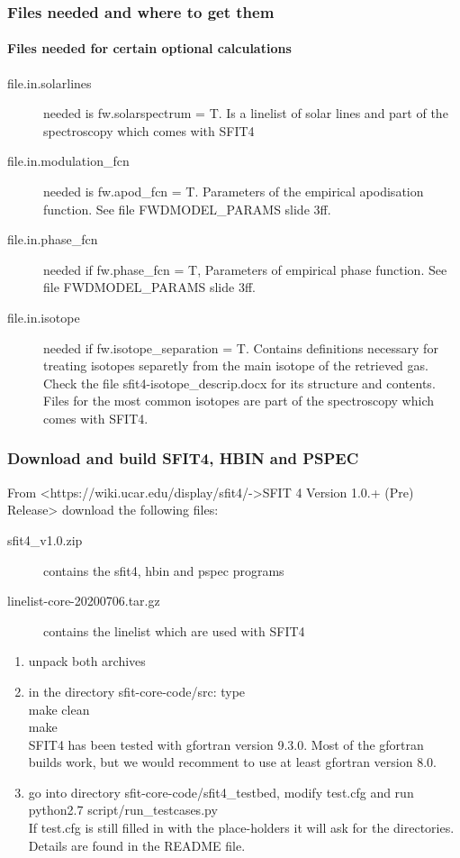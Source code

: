 \documentclass[notes=hide]{beamer}
\begin{document}
\begin{frame}
  \frametitle{Files needed and where to get them}
  \framesubtitle{Files needed for certain optional calculations}
  \begin{description}
  \item[file.in.solarlines] needed is fw.solarspectrum = T. Is a
    linelist of solar lines and part of the spectroscopy which comes
    with SFIT4
  \item[file.in.modulation\_fcn] needed is fw.apod\_fcn =
    T. Parameters of the empirical apodisation function. See file
    FWDMODEL\_PARAMS slide 3ff.
  \item[file.in.phase\_fcn] needed if fw.phase\_fcn = T, Parameters of
    empirical phase function. See file
    FWDMODEL\_PARAMS slide 3ff. 
  \item[file.in.isotope] needed if fw.isotope\_separation =
    T. Contains definitions necessary for treating isotopes separetly
    from the main isotope of the retrieved gas. Check the file
    sfit4-isotope\_descrip.docx for its structure and
    contents. Files for the most common isotopes are part of the
    spectroscopy which comes with SFIT4.
  \end{description}
\end{frame}

\begin{frame}
  \frametitle{Download and build SFIT4, HBIN and PSPEC}
  From <https://wiki.ucar.edu/display/sfit4/->SFIT 4 Version 1.0.+
  (Pre) Release> download the following files:
  \begin{description}
  \item [sfit4\_v1.0.zip] contains the sfit4, hbin and pspec programs
  \item[linelist-core-20200706.tar.gz]  contains the linelist which
    are used with SFIT4
  \end{description}
  \begin{enumerate}
  \item unpack both archives
  \item in the directory sfit-core-code/src: type\\
    make clean\\
    make\\
    SFIT4 has been tested with gfortran version 9.3.0. Most of the
    gfortran builds work, but we would recomment to use at least
    gfortran version 8.0.
  \item go into directory sfit-core-code/sfit4\_testbed, modify
    test.cfg and run\\
    python2.7 script/run\_testcases.py\\
    If test.cfg is still filled in with the place-holders it will ask
    for the directories. Details are found in the README file.
  \end{enumerate}
\end{frame}
\end{document}
